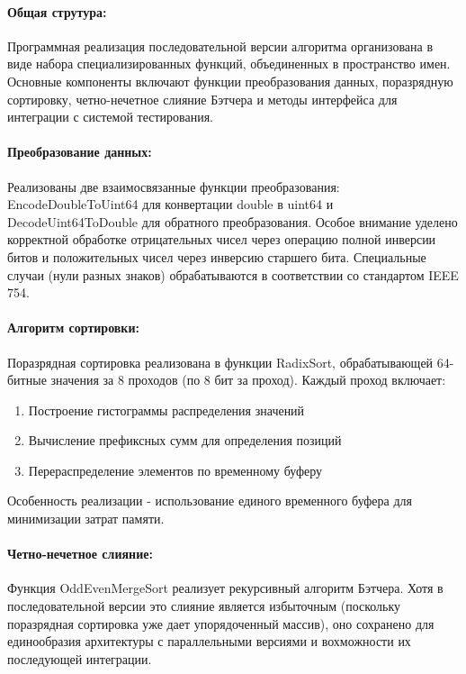 \documentclass[12pt]{article}
\begin{document}
\paragraph{Общая струтура:}
Программная реализация последовательной версии алгоритма организована в виде набора специализированных функций, объединенных в пространство имен. Основные компоненты включают функции преобразования данных, поразрядную сортировку, четно-нечетное слияние Бэтчера и методы интерфейса для интеграции с системой тестирования.

\paragraph{Преобразование данных:}
Реализованы две взаимосвязанные функции преобразования: EncodeDoubleToUint64 для конвертации double в uint64 и DecodeUint64ToDouble для обратного преобразования. Особое внимание уделено корректной обработке отрицательных чисел через операцию полной инверсии битов и положительных чисел через инверсию старшего бита. Специальные случаи (нули разных знаков) обрабатываются в соответствии со стандартом IEEE 754.

\paragraph{Алгоритм сортировки:}
Поразрядная сортировка реализована в функции RadixSort, обрабатывающей 64-битные значения за 8 проходов (по 8 бит за проход). Каждый проход включает:
\begin{enumerate}
	\item Построение гистограммы распределения значений
	\item Вычисление префиксных сумм для определения позиций
	\item Перераспределение элементов по временному буферу
\end{enumerate}
Особенность реализации - использование единого временного буфера для минимизации затрат памяти.

\paragraph{Четно-нечетное слияние:}
Функция OddEvenMergeSort реализует рекурсивный алгоритм Бэтчера. Хотя в последовательной версии это слияние является избыточным (поскольку поразрядная сортировка уже дает упорядоченный массив), оно сохранено для единообразия архитектуры с параллельными версиями и вохможности их последующей интеграции.
\end{document}
